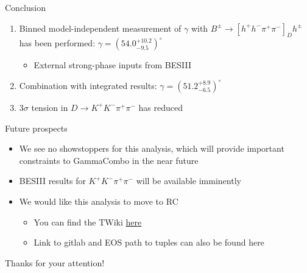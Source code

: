 \documentclass[xcolor={dvipsnames}]{beamer}
\begin{document}
\begin{frame}{Conclusion}
  \vspace{-0.1cm}
  \begin{enumerate}
    \setlength\itemsep{2.0em}
    \item{Binned model-independent measurement of $\gamma$ with $B^\pm\to[h^+h^-\pi^+\pi^-]_Dh^\pm$ has been performed: $\gamma = (54.0_{-9.5}^{+10.2})^\circ$}
    \begin{itemize}
      \item{External strong-phase inputs from BESIII}
    \end{itemize}
    \item{Combination with integrated results: $\gamma = (51.2_{-6.5}^{+8.9})^\circ$}
    \item{$3\sigma$ tension in $D\to K^+K^-\pi^+\pi^-$ has reduced}
  \end{enumerate}
\end{frame}

\begin{frame}{Future prospects}
  \vspace{0.6cm}
  \begin{itemize}
    \setlength\itemsep{2.0em}
    \item{We see no showstoppers for this analysis, which will provide important constraints to GammaCombo in the near future}
    \item{BESIII results for $K^+K^-\pi^+\pi^-$ will be available imminently}
    \item{We would like this analysis to move to RC}
    \begin{itemize}
      \item{You can find the TWiki \href{https://twiki.cern.ch/twiki/bin/viewauth/LHCbPhysics/BPGGSZB2DhD2hhpipiModelIndependent}{here}}
      \item{Link to gitlab and EOS path to tuples can also be found here}
    \end{itemize}
  \end{itemize}
  \vspace{0.5cm}
  \begin{center}
    {\huge Thanks for your attention!}
  \end{center}
\end{frame}
\end{document}
